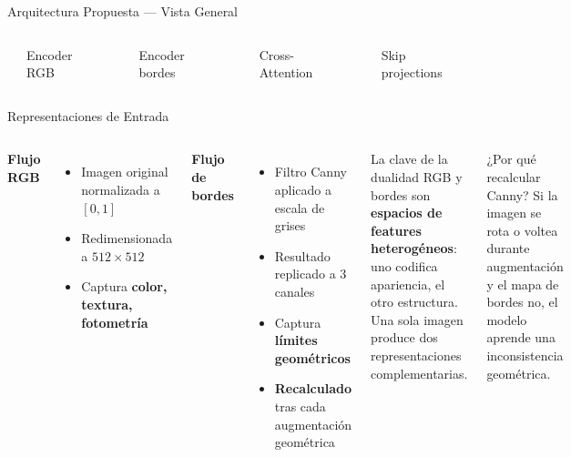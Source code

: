 \documentclass[aspectratio=169]{beamer}
\begin{document}

\begin{frame}{Arquitectura Propuesta — Vista General}
\centering
\resizebox{0.72\textwidth}{!}{}
\vspace{0.3em}
\begin{columns}
\centering
{\small \textcolor{blue!60}{\rule{0.8em}{0.6em}} Encoder RGB \quad \textcolor{red!50}{\rule{0.8em}{0.6em}} Encoder bordes}
\centering
{\small \textcolor{orange!70}{\rule{0.8em}{0.6em}} Cross-Attention \quad \textcolor{purple!50}{\rule{0.8em}{0.6em}} Skip projections}
\end{columns}
\end{frame}

\begin{frame}{Representaciones de Entrada}
\begin{columns}[T]
\textbf{Flujo RGB}
\begin{itemize}
    \item Imagen original normalizada a $[0,1]$
    \item Redimensionada a $512 \times 512$
    \item Captura \textbf{color, textura, fotometría}
\end{itemize}
\vspace{0.3em}
\textbf{Flujo de bordes}
\begin{itemize}
    \item Filtro Canny aplicado a escala de grises
    \item Resultado replicado a 3 canales
    \item Captura \textbf{límites geométricos}
    \item \textbf{Recalculado} tras cada augmentación geométrica
\end{itemize}
\begin{block}{La clave de la dualidad}
RGB y bordes son \textbf{espacios de features heterogéneos}: uno codifica apariencia, el otro estructura. Una sola imagen produce dos representaciones complementarias.
\end{block}
\vspace{0.3em}
\begin{alertblock}{¿Por qué recalcular Canny?}
Si la imagen se rota o voltea durante augmentación y el mapa de bordes no, el modelo aprende una inconsistencia geométrica.
\end{alertblock}
\end{columns}
\end{frame}
\end{document}
